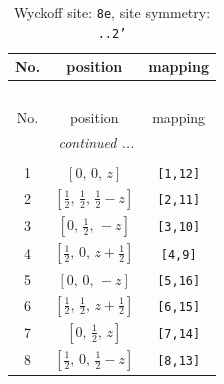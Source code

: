 \documentclass[fleqn,8pt]{jsarticle}
\begin{document}
\renewcommand{\arraystretch}{1.2}
\begin{longtable}{ccc}
\caption{Wyckoff site: {\tt 8e}, site symmetry: {\tt ..2'}}
 \\
 \hline \hline
No. & position & mapping \\ \hline \endfirsthead

\multicolumn{2}{l}{\tablename\ \thetable{}} \\
 \hline \hline
No. & position & mapping \\ \hline \endhead

 \hline \hline
\multicolumn{2}{r}{\footnotesize\it continued ...} \\ \endfoot

 \hline \hline
\multicolumn{2}{r}{} \\ \endlastfoot

1 & $\left[ 0,\, 0,\, z \right]$ & {\tt [1,12]} \\ \hline
2 & $\left[ \frac{1}{2},\, \frac{1}{2},\, \frac{1}{2} - z \right]$ & {\tt [2,11]} \\ \hline
3 & $\left[ 0,\, \frac{1}{2},\, - z \right]$ & {\tt [3,10]} \\ \hline
4 & $\left[ \frac{1}{2},\, 0,\, z + \frac{1}{2} \right]$ & {\tt [4,9]} \\ \hline
5 & $\left[ 0,\, 0,\, - z \right]$ & {\tt [5,16]} \\ \hline
6 & $\left[ \frac{1}{2},\, \frac{1}{2},\, z + \frac{1}{2} \right]$ & {\tt [6,15]} \\ \hline
7 & $\left[ 0,\, \frac{1}{2},\, z \right]$ & {\tt [7,14]} \\ \hline
8 & $\left[ \frac{1}{2},\, 0,\, \frac{1}{2} - z \right]$ & {\tt [8,13]} \\
\end{longtable}
\renewcommand{\arraystretch}{1.2}
\end{document}
